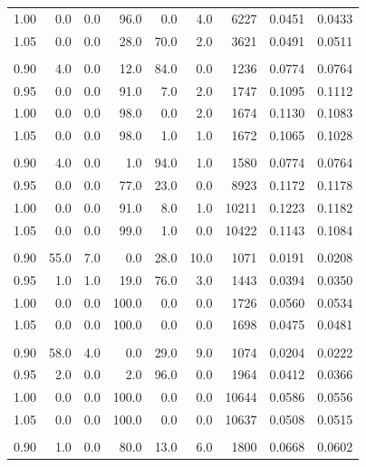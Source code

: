 \begin{table}[t]
\begin{tabular}{r r r r r r r r r}
1.00 & 0.0 & 0.0 & 96.0 & 0.0 & 4.0 & 6227 & 0.0451 & 0.0433 \\
1.05 & 0.0 & 0.0 & 28.0 & 70.0 & 2.0 & 3621 & 0.0491 & 0.0511 \\
\addlinespace[0.35em]
\multicolumn{9}{l}{$N=8$, $\mathrm{ppn}=4$, $t=1\,\mathrm{s}$} \\
\midrule
0.90 & 4.0 & 0.0 & 12.0 & 84.0 & 0.0 & 1236 & 0.0774 & 0.0764 \\
0.95 & 0.0 & 0.0 & 91.0 & 7.0 & 2.0 & 1747 & 0.1095 & 0.1112 \\
1.00 & 0.0 & 0.0 & 98.0 & 0.0 & 2.0 & 1674 & 0.1130 & 0.1083 \\
1.05 & 0.0 & 0.0 & 98.0 & 1.0 & 1.0 & 1672 & 0.1065 & 0.1028 \\
\addlinespace[0.35em]
\multicolumn{9}{l}{$N=8$, $\mathrm{ppn}=4$, $t=10\,\mathrm{s}$} \\
\midrule
0.90 & 4.0 & 0.0 & 1.0 & 94.0 & 1.0 & 1580 & 0.0774 & 0.0764 \\
0.95 & 0.0 & 0.0 & 77.0 & 23.0 & 0.0 & 8923 & 0.1172 & 0.1178 \\
1.00 & 0.0 & 0.0 & 91.0 & 8.0 & 1.0 & 10211 & 0.1223 & 0.1182 \\
1.05 & 0.0 & 0.0 & 99.0 & 1.0 & 0.0 & 10422 & 0.1143 & 0.1084 \\
\addlinespace[0.35em]
\multicolumn{9}{l}{$N=8$, $\mathrm{ppn}=8$, $t=1\,\mathrm{s}$} \\
\midrule
0.90 & 55.0 & 7.0 & 0.0 & 28.0 & 10.0 & 1071 & 0.0191 & 0.0208 \\
0.95 & 1.0 & 1.0 & 19.0 & 76.0 & 3.0 & 1443 & 0.0394 & 0.0350 \\
1.00 & 0.0 & 0.0 & 100.0 & 0.0 & 0.0 & 1726 & 0.0560 & 0.0534 \\
1.05 & 0.0 & 0.0 & 100.0 & 0.0 & 0.0 & 1698 & 0.0475 & 0.0481 \\
\addlinespace[0.35em]
\multicolumn{9}{l}{$N=8$, $\mathrm{ppn}=8$, $t=10\,\mathrm{s}$} \\
\midrule
0.90 & 58.0 & 4.0 & 0.0 & 29.0 & 9.0 & 1074 & 0.0204 & 0.0222 \\
0.95 & 2.0 & 0.0 & 2.0 & 96.0 & 0.0 & 1964 & 0.0412 & 0.0366 \\
1.00 & 0.0 & 0.0 & 100.0 & 0.0 & 0.0 & 10644 & 0.0586 & 0.0556 \\
1.05 & 0.0 & 0.0 & 100.0 & 0.0 & 0.0 & 10637 & 0.0508 & 0.0515 \\
\addlinespace[0.35em]
\multicolumn{9}{l}{$N=16$, $\mathrm{ppn}=4$, $t=1\,\mathrm{s}$} \\
\midrule
0.90 & 1.0 & 0.0 & 80.0 & 13.0 & 6.0 & 1800 & 0.0668 & 0.0602 \\

\end{tabular}
\end{table}
